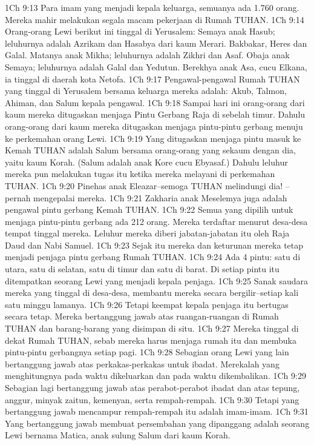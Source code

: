 1Ch 9:13  Para imam yang menjadi kepala keluarga, semuanya ada 1.760 orang. Mereka mahir melakukan segala macam pekerjaan di Rumah TUHAN.
1Ch 9:14  Orang-orang Lewi berikut ini tinggal di Yerusalem: Semaya anak Hasub; leluhurnya adalah Azrikam dan Hasabya dari kaum Merari. Bakbakar, Heres dan Galal. Matanya anak Mikha; leluhurnya adalah Zikhri dan Asaf. Obaja anak Semaya; leluhurnya adalah Galal dan Yedutun. Berekhya anak Asa, cucu Elkana, ia tinggal di daerah kota Netofa.
1Ch 9:17  Pengawal-pengawal Rumah TUHAN yang tinggal di Yerusalem bersama keluarga mereka adalah: Akub, Talmon, Ahiman, dan Salum kepala pengawal.
1Ch 9:18  Sampai hari ini orang-orang dari kaum mereka ditugaskan menjaga Pintu Gerbang Raja di sebelah timur. Dahulu orang-orang dari kaum mereka ditugaskan menjaga pintu-pintu gerbang menuju ke perkemahan orang Lewi.
1Ch 9:19  Yang ditugaskan menjaga pintu masuk ke Kemah TUHAN adalah Salum bersama orang-orang yang sekaum dengan dia, yaitu kaum Korah. (Salum adalah anak Kore cucu Ebyasaf.) Dahulu leluhur mereka pun melakukan tugas itu ketika mereka melayani di perkemahan TUHAN.
1Ch 9:20  Pinehas anak Eleazar--semoga TUHAN melindungi dia! --pernah mengepalai mereka.
1Ch 9:21  Zakharia anak Meselemya juga adalah pengawal pintu gerbang Kemah TUHAN.
1Ch 9:22  Semua yang dipilih untuk menjaga pintu-pintu gerbang ada 212 orang. Mereka terdaftar menurut desa-desa tempat tinggal mereka. Leluhur mereka diberi jabatan-jabatan itu oleh Raja Daud dan Nabi Samuel.
1Ch 9:23  Sejak itu mereka dan keturunan mereka tetap menjadi penjaga pintu gerbang Rumah TUHAN.
1Ch 9:24  Ada 4 pintu: satu di utara, satu di selatan, satu di timur dan satu di barat. Di setiap pintu itu ditempatkan seorang Lewi yang menjadi kepala penjaga.
1Ch 9:25  Sanak saudara mereka yang tinggal di desa-desa, membantu mereka secara bergilir--setiap kali satu minggu lamanya.
1Ch 9:26  Tetapi keempat kepala penjaga itu bertugas secara tetap. Mereka bertanggung jawab atas ruangan-ruangan di Rumah TUHAN dan barang-barang yang disimpan di situ.
1Ch 9:27  Mereka tinggal di dekat Rumah TUHAN, sebab mereka harus menjaga rumah itu dan membuka pintu-pintu gerbangnya setiap pagi.
1Ch 9:28  Sebagian orang Lewi yang lain bertanggung jawab atas perkakas-perkakas untuk ibadat. Merekalah yang menghitungnya pada waktu dikeluarkan dan pada waktu dikembalikan.
1Ch 9:29  Sebagian lagi bertanggung jawab atas perabot-perabot ibadat dan atas tepung, anggur, minyak zaitun, kemenyan, serta rempah-rempah.
1Ch 9:30  Tetapi yang bertanggung jawab mencampur rempah-rempah itu adalah imam-imam.
1Ch 9:31  Yang bertanggung jawab membuat persembahan yang dipanggang adalah seorang Lewi bernama Matica, anak sulung Salum dari kaum Korah.
